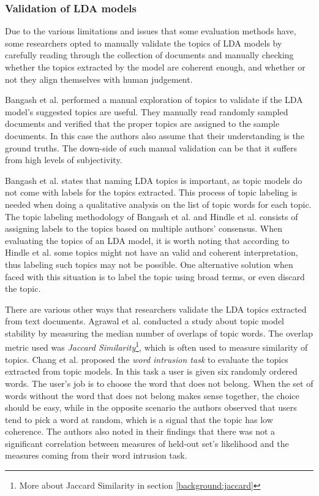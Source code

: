         \subsubsection{Validation of LDA models}
            Due to the various limitations and issues that some evaluation methods have, some researchers opted to manually validate the topics of LDA models by carefully reading through the collection of documents and manually checking whether the topics extracted by the model are coherent enough, and whether or not they align themselves with human judgement. 
            
            Bangash et al. \cite{bangash2019developers} performed a manual exploration of topics to validate if the LDA model's suggested topics are useful. They manually read randomly sampled documents and verified that the proper topics are assigned to the sample documents. In this case the authors also assume that their understanding is the ground truths. The down-side of such manual validation can be that it suffers from high levels of subjectivity.
             
            \label{topicLabeling} Bangash et al. \cite{bangash2019developers} states that naming LDA topics is important, as topic models do not come with labels for the topics extracted. This process of topic labeling is needed when doing a qualitative analysis on the list of topic words for each topic. The topic labeling methodology of Bangash et al. \cite{bangash2019developers} and Hindle et al. \cite{hindle2012relating} consists of assigning labels to the topics based on multiple authors’ consensus. When evaluating the topics of an LDA model, it is worth noting that according to Hindle et al. \cite{hindle2012relating} some topics might not have an valid and coherent interpretation, thus labeling such topics may not be possible. One alternative solution when faced with this situation is to label the topic using broad terms, or even discard the topic.
            
            There are various other ways that researchers validate the LDA topics extracted from text documents. Agrawal et al. \cite{agrawal2018wrong} conducted a study about topic model stability by measuring the median number of overlaps of topic words. The overlap metric used was \emph{Jaccard Similarity}\footnote{More about Jaccard Similarity in section \ref{background:jaccard}}, which is often used to measure similarity of topics. Chang et al. \cite{chang2009reading} proposed the \emph{word intrusion task} to evaluate the topics extracted from topic models. In this task a user is given six randomly ordered words. The user's job is to choose the word that does not belong. When the set of words without the word that does not belong makes sense together, the choice should be easy, while in the opposite scenario the authors observed that users tend to pick a word at random, which is a signal that the topic has low coherence. The authors also noted in their findings that there was not a significant correlation between measures of held-out set's likelihood and the measures coming from their word intrusion task.
        
